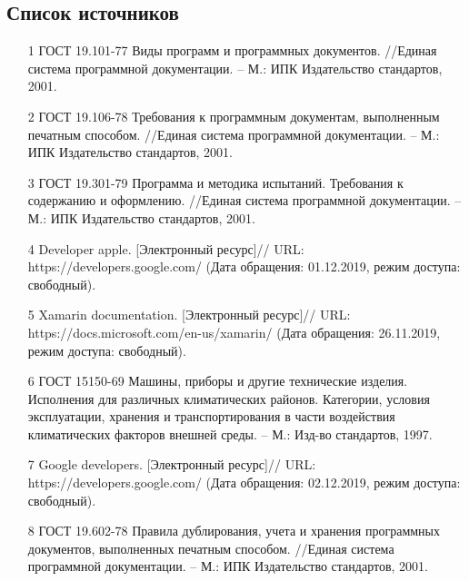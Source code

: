 \pagestyle{fancy}

\subsection{Список источников}

\begin{enumerate}
	\item[1] ГОСТ 19.101-77 Виды программ и программных документов. //Единая система программной документации. – М.: ИПК Издательство стандартов, 2001.
	\item[2] ГОСТ 19.106-78 Требования к программным документам, выполненным печатным способом. //Единая система программной документации. – М.: ИПК Издательство стандартов, 2001.
	\item[3] ГОСТ 19.301-79 Программа и методика испытаний. Требования к содержанию и оформлению. //Единая система программной документации. – М.: ИПК Издательство стандартов, 2001.
	\item[4] Developer apple. [Электронный ресурс]// URL: https://developers.google.com/ (Дата обращения: 01.12.2019, режим доступа: свободный).
	\item[5] Xamarin documentation. [Электронный ресурс]// URL: https://docs.microsoft.com/en-us/xamarin/ (Дата обращения: 26.11.2019, режим доступа: свободный).
	\item[6] ГОСТ 15150-69 Машины, приборы и другие технические изделия. Исполнения для различных климатических районов. Категории, условия эксплуатации, хранения и транспортирования в части воздействия климатических факторов внешней среды. – М.: Изд-во стандартов, 1997. 
	\item[7] Google developers. [Электронный ресурс]// URL: https://developers.google.com/ (Дата обращения: 02.12.2019, режим доступа: свободный).
	\item[8] ГОСТ 19.602-78 Правила дублирования, учета и хранения программных документов, выполненных печатным способом. //Единая система программной документации. – М.: ИПК Издательство стандартов, 2001.
\end{enumerate}